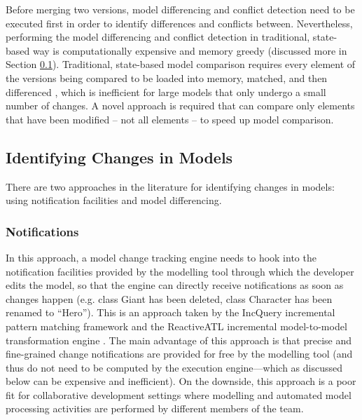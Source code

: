 Before merging two versions, model differencing and conflict detection need to be executed first in order to identify differences and conflicts between. Nevertheless, performing the model differencing and conflict detection in traditional, state-based way is computationally expensive and memory greedy (discussed more in Section \ref{sec:identifying_changes_in models}). Traditional, state-based model comparison requires every element of the versions being compared to be loaded into memory, matched, and then differenced \cite{emfcompare2018developer}, which is inefficient for large models that only undergo a small number of changes. A novel approach is required that can compare only elements that have been modified -- not all elements -- to speed up model comparison.

\subsection{Identifying Changes in Models}
\label{sec:identifying_changes_in models}
There are two approaches in the literature for identifying changes in models: using notification facilities and model differencing.

\subsubsection{Notifications}
\label{sec:notifications}
In this approach, a model change tracking 
engine needs to hook into the notification facilities 
provided by the modelling tool through which the developer edits the model, 
so that the engine can directly receive notifications as soon as 
changes happen (e.g. class \textsf{Giant} has been deleted, class \textsf{Character} has been renamed to ``Hero''). 
This is an approach taken by the IncQuery incremental pattern matching 
framework \cite{DBLP:conf/ecmdafa/RathHV12} and the ReactiveATL incremental model-to-model 
transformation engine \cite{DBLP:conf/ecmdafa/OgunyomiRK15}. The main advantage of this 
approach is that precise and fine-grained change notifications are provided 
for free by the modelling tool (and thus do not need to be computed by the 
execution engine---which as discussed below can be expensive and inefficient). 
On the downside, this approach is a poor fit for collaborative development 
settings where modelling and automated model processing activities are 
performed by different members of the team.

